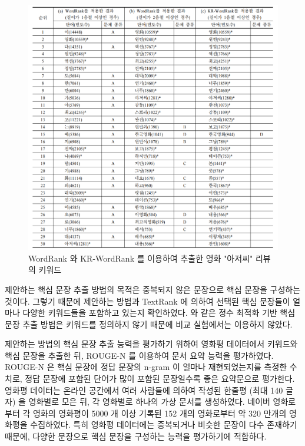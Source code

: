 \documentclass[oneside, ko,phd]{snuthesis_utf8_kor}
\begin{document}
\begin{figure}[H]
\centering
\includegraphics[keepaspectratio=true, width=0.9\linewidth]{fig/krwordrank_vs_wordrank.png}
\caption{WordRank 와 KR-WordRank 를 이용하여 추출한 영화 "아저씨" 리뷰의 키워드}
\label{fig:krwordrank_vs_wordrank}
\end{figure}

제안하는 핵심 문장 추출 방법의 목적은 중복되지 않은 문장으로 핵심 문장을 구성하는 것이다.
그렇기 때문에 제안하는 방법과 TextRank 에 의하여 선택된 핵심 문장들이 얼마나 다양한 키워드들을 포함하고 있는지 확인하였다.
\cite{mcdonald2007study, parveen2015topical} 와 같은 정수 최적화 기반 핵심 문장 추출 방법은 키워드를 정의하지 않기 때문에 비교 실험에서는 이용하지 않았다.

제안하는 방법의 핵심 문장 추출 능력을 평가하기 위하여 영화평 데이터에서 키워드와 핵심 문장을 추출한 뒤, ROUGE-N \cite{lin2004rouge} 를 이용하여 문서 요약 능력을 평가하였다.
ROUGE-N 은 핵심 문장에 정답 문장의 n-gram 이 얼마나 재현되었는지를 측정한 수치로, 정답 문장에 포함된 단어가 많이 포함된 문장일수록 좋은 요약문으로 평가한다.
영화평 데이터는 온라인 공간에서 여러 사람들에 의하여 작성된 한줄평 (최대 140 글자) 을 영화별로 모은 뒤, 각 영화별로 하나의 가상 문서를 생성하였다.
네이버 영화로부터 각 영화의 영화평이 5000 개 이상 기록된 152 개의 영화로부터 약 320 만개의 영화평을 수집하였다.
특히 영화평 데이터에는 중복되거나 비슷한 문장이 다수 존재하기 때문에, 다양한 문장으로 핵심 문장을 구성하는 능력을 평가하기에 적합하다.
\end{document}
